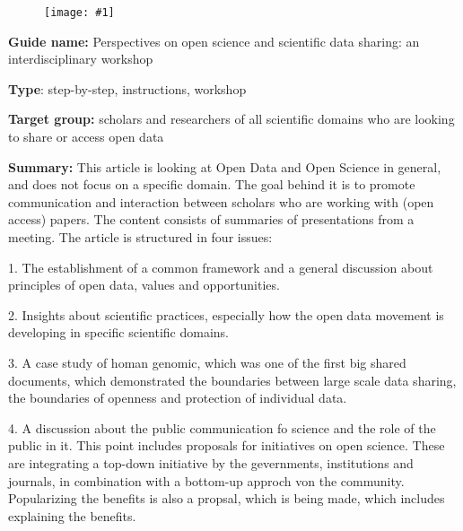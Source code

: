 \documentclass{article}
\newlength{\imgwidth}
\newcommand\scaledgraphics[2]{%
                
\settowidth{\imgwidth}{\texttt{[image: \#1]}}%
                
\setlength{\imgwidth}{\minof{\imgwidth}{#2\textwidth}}%
                
\texttt{[image: \#1]}%
                
}
\begin{document}
\begin{center}
\begin{figure}
\scaledgraphics{6ab89e0c-e542-4afd-b586-eabe59773bc0.jpg}{0.5}
\label{F43484161}
\end{figure}


\end{center}





\textbf{Guide name:}  Perspectives on open science and scientific data sharing: an interdisciplinary workshop \autocite{destro_bisol_perspectives_2014}





\textbf{Type}: step-by-step, instructions, workshop





\textbf{Target group:} scholars and researchers of all scientific domains who are looking to share or access open data





\textbf{Summary:} This article is looking at Open Data and Open Science in general, and does not focus on a specific domain. The goal behind it is to promote communication and interaction between scholars who are working with (open access) papers. The content consists of summaries of presentations from a meeting. The article is structured in four issues:


1. The establishment of a common framework and a general discussion about principles of open data, values and opportunities.


2. Insights about scientific practices, especially how the open data movement is developing in specific scientific domains.


3. A case study of homan genomic, which was one of the first big shared documents, which demonstrated the boundaries between large scale data sharing, the boundaries of openness and protection of individual data.


4. A discussion about the public communication fo science and the role of the public in it. This point includes proposals for initiatives on open science. These are integrating a top-down initiative by the gevernments, institutions and journals, in combination with a bottom-up approch von the community. Popularizing the benefits is also a propsal, which is being made, which includes explaining the benefits.
\end{document}
